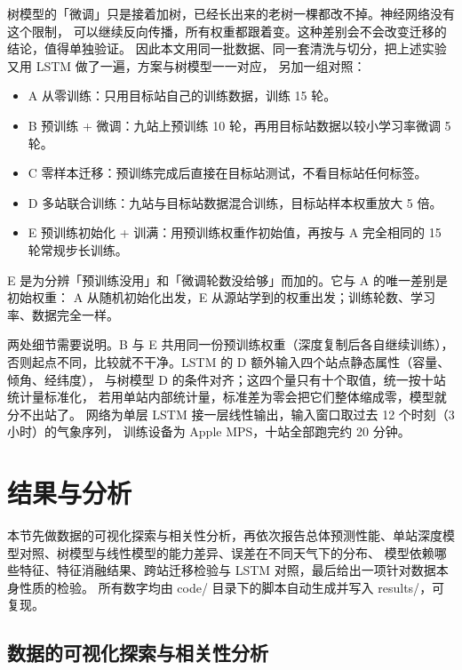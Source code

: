 \documentclass[11pt,a4paper]{ctexart}
\begin{document}
树模型的「微调」只是接着加树，已经长出来的老树一棵都改不掉。神经网络没有这个限制，
可以继续反向传播，所有权重都跟着变。这种差别会不会改变迁移的结论，值得单独验证。
因此本文用同一批数据、同一套清洗与切分，把上述实验又用 LSTM 做了一遍，方案与树模型一一对应，
另加一组对照：

\begin{itemize}
  \item A 从零训练：只用目标站自己的训练数据，训练 15 轮。
  \item B 预训练 + 微调：九站上预训练 10 轮，再用目标站数据以较小学习率微调 5 轮。
  \item C 零样本迁移：预训练完成后直接在目标站测试，不看目标站任何标签。
  \item D 多站联合训练：九站与目标站数据混合训练，目标站样本权重放大 5 倍。
  \item E 预训练初始化 + 训满：用预训练权重作初始值，再按与 A 完全相同的 15 轮常规步长训练。
\end{itemize}

E 是为分辨「预训练没用」和「微调轮数没给够」而加的。它与 A 的唯一差别是初始权重：
A 从随机初始化出发，E 从源站学到的权重出发；训练轮数、学习率、数据完全一样。

两处细节需要说明。B 与 E 共用同一份预训练权重（深度复制后各自继续训练），
否则起点不同，比较就不干净。LSTM 的 D 额外输入四个站点静态属性（容量、倾角、经纬度），
与树模型 D 的条件对齐；这四个量只有十个取值，统一按十站统计量标准化，
若用单站内部统计量，标准差为零会把它们整体缩成零，模型就分不出站了。
网络为单层 LSTM 接一层线性输出，输入窗口取过去 12 个时刻（3 小时）的气象序列，
训练设备为 Apple MPS，十站全部跑完约 20 分钟。

\section{结果与分析}

本节先做数据的可视化探索与相关性分析，再依次报告总体预测性能、单站深度模型对照、树模型与线性模型的能力差异、误差在不同天气下的分布、
模型依赖哪些特征、特征消融结果、跨站迁移检验与 LSTM 对照，最后给出一项针对数据本身性质的检验。
所有数字均由 {\ttfamily code/} 目录下的脚本自动生成并写入 {\ttfamily results/}，可复现。

\subsection{数据的可视化探索与相关性分析}
\label{sec:explore}
\end{document}
